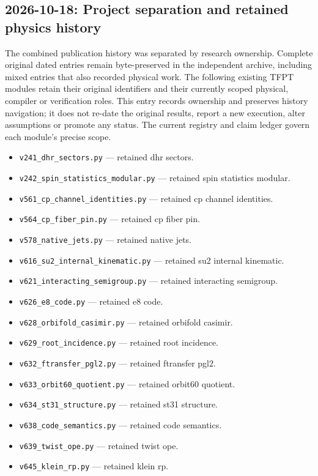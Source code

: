\documentclass[11pt]{article}
\begin{document}
\subsection*{2026-10-18: Project separation and retained physics history}
The combined publication history was separated by research ownership.  Complete
original dated entries remain byte-preserved in the independent archive, including
mixed entries that also recorded physical work.  The following existing TFPT
modules retain their original identifiers and their currently scoped physical,
compiler or verification roles.  This entry records ownership and preserves
history navigation; it does not re-date the original results, report a new
execution, alter assumptions or promote any status.  The current registry and
claim ledger govern each module's precise scope.
\begin{itemize}[leftmargin=2em,itemsep=1pt]
\item \texttt{v241\_dhr\_sectors.py} --- retained dhr sectors.
\item \texttt{v242\_spin\_statistics\_modular.py} --- retained spin statistics modular.
\item \texttt{v561\_cp\_channel\_identities.py} --- retained cp channel identities.
\item \texttt{v564\_cp\_fiber\_pin.py} --- retained cp fiber pin.
\item \texttt{v578\_native\_jets.py} --- retained native jets.
\item \texttt{v616\_su2\_internal\_kinematic.py} --- retained su2 internal kinematic.
\item \texttt{v621\_interacting\_semigroup.py} --- retained interacting semigroup.
\item \texttt{v626\_e8\_code.py} --- retained e8 code.
\item \texttt{v628\_orbifold\_casimir.py} --- retained orbifold casimir.
\item \texttt{v629\_root\_incidence.py} --- retained root incidence.
\item \texttt{v632\_ftransfer\_pgl2.py} --- retained ftransfer pgl2.
\item \texttt{v633\_orbit60\_quotient.py} --- retained orbit60 quotient.
\item \texttt{v634\_st31\_structure.py} --- retained st31 structure.
\item \texttt{v638\_code\_semantics.py} --- retained code semantics.
\item \texttt{v639\_twist\_ope.py} --- retained twist ope.
\item \texttt{v645\_klein\_rp.py} --- retained klein rp.

\end{itemize}
\end{document}
